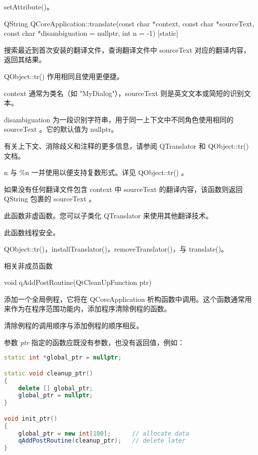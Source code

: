 \begin{seeAlso}
setAttribute()。
\end{seeAlso}

QString QCoreApplication::translate(const char *context, const char *sourceText, const char *disambiguation = nullptr, int n = -1) [static]

搜索最近到首次安装的翻译文件，查询翻译文件中 sourceText 对应的翻译内容，返回其结果。

QObject::tr() 作用相同且使用更便捷。

context 通常为类名（如 "MyDialog"），sourceText 则是英文文本或简短的识别文本。

disambiguation 为一段识别字符串，用于同一上下文中不同角色使用相同的 sourceText 。它的默认值为 nullptr。

有关上下文、消除歧义和注释的更多信息，请参阅 QTranslator 和 QObject::tr() 文档。

n 与 \%n 一并使用以便支持复数形式。详见 QObject::tr() 。

如果没有任何翻译文件包含 context 中 sourceText 的翻译内容，该函数则返回 QString 包裹的 sourceText 。

此函数非虚函数。您可以子类化 QTranslator 来使用其他翻译技术。


\begin{notice}
此函数线程安全。
\end{notice}


\begin{seeAlso}
QObject::tr()，installTranslator()，removeTranslator()，与 translate()。
\end{seeAlso}

\splitLine

相关非成员函数

void qAddPostRoutine(QtCleanUpFunction ptr)

添加一个全局例程，它将在 QCoreApplication 析构函数中调用。这个函数通常用来作为在程序范围功能内，添加程序清除例程的函数。

清除例程的调用顺序与添加例程的顺序相反。

参数 \emph{ptr} 指定的函数应既没有参数，也没有返回值，例如：


\begin{lstlisting}[language=C++]
static int *global_ptr = nullptr;

static void cleanup_ptr()
{
    delete [] global_ptr;
    global_ptr = nullptr;
}

void init_ptr()
{
    global_ptr = new int[100];      // allocate data
    qAddPostRoutine(cleanup_ptr);   // delete later
}
\end{lstlisting}



